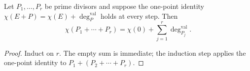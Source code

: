 \begin{theorem}
  \label{thm:adelic_chi_telescope_effective}
  \leanok
  Let \(P_1,\ldots,P_r\) be prime divisors and suppose the one-point
  identity
  \(\chi(E+P)=\chi(E)+\deg_P^{\mathrm{val}}\) holds at every step.  Then
  \[
    \chi(P_1+\cdots+P_r)
      =\chi(0)+\sum_{j=1}^r\deg_{P_j}^{\mathrm{val}}.
  \]
\end{theorem}
\begin{proof}
  \leanok
  Induct on \(r\).  The empty sum is immediate; the induction step applies
  the one-point identity to \(P_1+(P_2+\cdots+P_r)\).
\end{proof}

